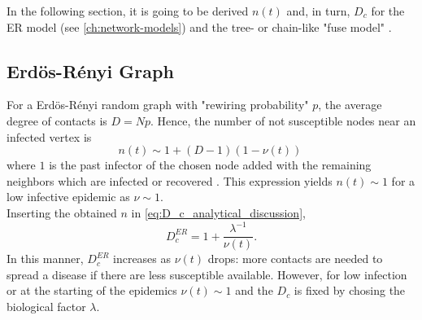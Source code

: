 \documentclass[a4paper,10pt,twoside]{book} %
\theoremstyle{definition}
\begin{document}
In the following section, it is going to be derived $n(t)$ and, in turn, $D_c$ for the ER model (see \autoref{ch:network-models}) and the tree- or chain-like "fuse model" \cite{Thurner::NetBasedExpl}.

\subsection*{Erdös-Rényi Graph}
For a Erdös-Rényi random graph with "rewiring probability" $p$, the average degree of contacts is $D = Np$. Hence, the number of not susceptible nodes near an infected vertex is 
\begin{equation}
	n(t) \sim 1 + (D-1)(1-\nu(t))\
	\label{eq:n(t)_ER}
\end{equation}
where $1$ is the past infector of the chosen node added with the remaining neighbors which are infected or recovered \cite{Thurner::Appendix_NetBasedExpl}. This expression yields $ n(t) \sim 1$ for a low infective epidemic as $ \nu \sim 1$. 
\\Inserting the obtained $n$ in \autoref{eq:D_c_analytical_discussion}, 
\begin{equation}
	D_c^{ER} = 1 + \frac{ \lambda^{-1} }{ \nu(t)}.
	\label{eq:Dc_ERenyi}
\end{equation}
In this manner, $D_c^{ER}$ increases as $\nu(t)$ drops: more contacts are needed to spread a disease if there are less susceptible available. However, for low infection or at the starting of the epidemics $\nu(t) \sim 1$ and the $ D_c$ is fixed by chosing the biological factor $ \lambda$. 
\end{document}
